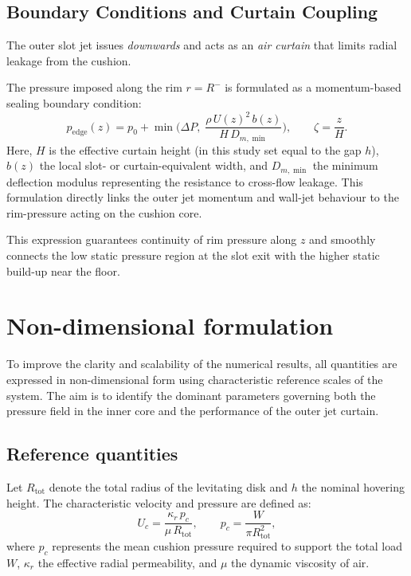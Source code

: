 \documentclass[11pt,a4paper]{article}
\begin{document}
\subsection{Boundary Conditions and Curtain Coupling} \label{sec:boundaryconditions}
The outer slot jet issues \emph{downwards} and acts as an \emph{air curtain} that
limits radial leakage from the cushion. 

The pressure imposed along the rim $r=R^{-}$ is formulated as a momentum-based sealing boundary condition:
\begin{equation}
p_{\mathrm{edge}}(z)=p_0 + \min\!\Bigg(\Delta P,\;\frac{\rho\,U(z)^2\,b(z)}{H\,D_{m,\min}}\Bigg),
\qquad \zeta=\frac{z}{H}. \label{eq:p_edge_seal}
\end{equation}
Here, $H$ is the effective curtain height (in this study set equal to the gap $h$), $b(z)$ the local slot- or curtain-equivalent width, and $D_{m,\min}$ the minimum deflection modulus representing the resistance to cross-flow leakage. This formulation directly links the outer jet momentum and wall-jet behaviour to the rim-pressure acting on the cushion core.

This expression guarantees continuity of rim pressure along $z$ and smoothly connects
the low static pressure region at the slot exit with the higher static build-up near the
floor.


\section{Non-dimensional formulation}
\label{sec:non-dimensionalization}

To improve the clarity and scalability of the numerical results, all quantities are expressed in non-dimensional form using characteristic reference scales of the system. The aim is to identify the dominant parameters governing both the pressure field in the inner core and the performance of the outer jet curtain.

\subsection{Reference quantities}

Let \(R_{\mathrm{tot}}\) denote the total radius of the levitating disk and \(h\) the nominal hovering height.  
The characteristic velocity and pressure are defined as:
\[
U_c = \frac{\kappa_r\,p_c}{\mu\,R_{\mathrm{tot}}}, 
\qquad 
p_c = \frac{W}{\pi R_{\mathrm{tot}}^2},
\]
where \(p_c\) represents the mean cushion pressure required to support the total load \(W\), \(\kappa_r\) the effective radial permeability, and \(\mu\) the dynamic viscosity of air.
\end{document}
